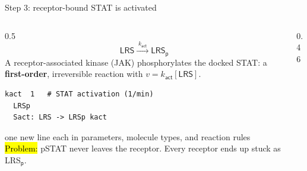 \documentclass[aspectratio=169,10pt,t]{beamer}
\newcommand{\conc}[1]{[\mathsf{#1}]}
\begin{document}
\begin{frame}[fragile]{Step 3: receptor-bound STAT is activated}
  \begin{columns}[T]
    \begin{column}{0.5\textwidth}
      \[
        \mathsf{LRS} \xrightarrow{\;k_\mathsf{act}\;} \mathsf{LRS_p}
      \]
      A receptor-associated kinase (JAK) phosphorylates the docked STAT:
      a \textbf{first-order}, irreversible reaction with $v = k_\mathsf{act}\conc{LRS}$.
\begin{lstlisting}[language=bngl]
  kact  1   # STAT activation (1/min)
  LRSp
  Sact: LRS -> LRSp kact
\end{lstlisting}
      {\scriptsize\color{fsGray}one new line each in parameters, molecule types, and reaction rules}
      \vskip3mm
      \hl{Problem:} pSTAT never leaves the receptor. Every receptor ends up
      stuck as LRS$_\mathsf{p}$.
    \end{column}
    \begin{column}{0.46\textwidth}
      \centering
      \\[1mm]
    \end{column}
  \end{columns}
\end{frame}
\end{document}

